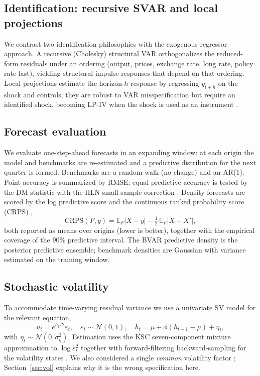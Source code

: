 \documentclass[conference]{IEEEtran}
\begin{document}
\subsection{Identification: recursive SVAR and local projections}
We contrast two identification philosophies with the exogenous-regressor
approach. A recursive (Cholesky) structural VAR orthogonalizes the reduced-form
residuals under an ordering (output, prices, exchange rate, long rate, policy
rate last), yielding structural impulse responses that depend on that ordering.
Local projections \cite{jorda2005} estimate the horizon-$h$ response by
regressing $y_{t+h}$ on the shock and controls; they are robust to VAR
misspecification but require an identified shock, becoming LP-IV when the shock
is used as an instrument \cite{stockwatson2012,mertensravn2013}.

\subsection{Forecast evaluation}
We evaluate one-step-ahead forecasts in an expanding window: at each origin the
model and benchmarks are re-estimated and a predictive distribution for the next
quarter is formed. Benchmarks are a random walk (no-change) and an AR(1).
Point accuracy is summarized by RMSE; equal predictive accuracy is tested by the
DM statistic with the HLN small-sample correction \cite{dm1995,hln1997}. Density
forecasts are scored by the log predictive score and the continuous ranked
probability score (CRPS) \cite{gneiting2007},
\begin{equation}
\mathrm{CRPS}(F,y)=\mathbb{E}_F|X-y|-\tfrac{1}{2}\,\mathbb{E}_F|X-X'|,
\end{equation}
both reported as means over origins (lower is better), together with the
empirical coverage of the $90\%$ predictive interval. The BVAR predictive
density is the posterior predictive ensemble; benchmark densities are Gaussian
with variance estimated on the training window.

\subsection{Stochastic volatility}
To accommodate time-varying residual variance we use a univariate SV model for
the relevant equation,
\begin{equation}
u_t=e^{h_t/2}\varepsilon_t,\quad \varepsilon_t\sim\mathcal{N}(0,1),\quad
h_t=\mu+\phi(h_{t-1}-\mu)+\eta_t,
\end{equation}
with $\eta_t\sim\mathcal{N}(0,\sigma_\eta^2)$. Estimation uses the KSC
seven-component mixture approximation to $\log\varepsilon_t^2$ together with
forward-filtering backward-sampling for the volatility states
\cite{ksc1998,primiceri2005}. We also considered a single \emph{common}
volatility factor \cite{ccm2016}; Section~\ref{sec:vol} explains why it is the
wrong specification here.
\end{document}
